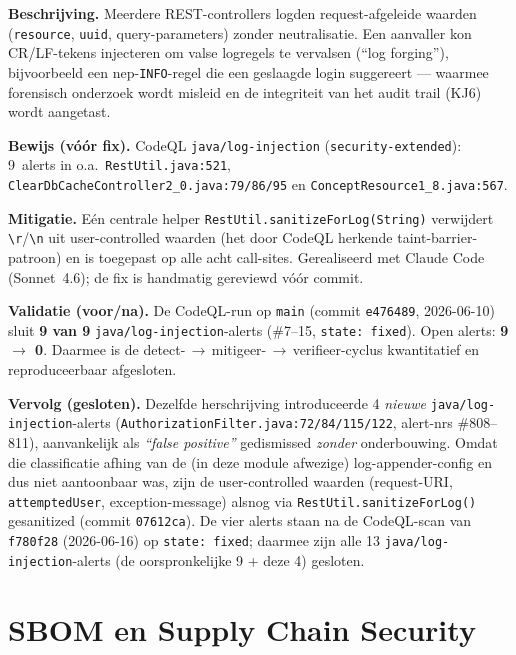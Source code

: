 \documentclass[12pt, a4paper]{report}
\begin{document}
\textbf{Beschrijving.} Meerdere REST-controllers logden request-afgeleide waarden
(\texttt{resource}, \texttt{uuid}, query-parameters) zonder neutralisatie. Een
aanvaller kon CR/LF-tekens injecteren om valse logregels te vervalsen (``log
forging''), bijvoorbeeld een nep-\texttt{INFO}-regel die een geslaagde login
suggereert --- waarmee forensisch onderzoek wordt misleid en de integriteit van het
audit trail (KJ6) wordt aangetast.

\textbf{Bewijs (vóór fix).} CodeQL \texttt{java/log-injection}
(\texttt{security-extended}): 9~alerts in o.a.\ \texttt{RestUtil.java:521},
\texttt{ClearDbCacheController2\_0.java:79/86/95} en
\texttt{ConceptResource1\_8.java:567}.

\textbf{Mitigatie.} Eén centrale helper \texttt{RestUtil.sanitizeForLog(String)}
verwijdert \texttt{\textbackslash r}/\texttt{\textbackslash n} uit user-controlled
waarden (het door CodeQL herkende taint-barrier-patroon) en is toegepast op alle
acht call-sites. Gerealiseerd met Claude Code (Sonnet~4.6); de fix is handmatig
gereviewd vóór commit.

\textbf{Validatie (voor/na).} De CodeQL-run op \texttt{main}
(commit \texttt{e476489}, 2026-06-10) sluit \textbf{9 van 9}
\texttt{java/log-injection}-alerts (\#7--15, \texttt{state: fixed}). Open alerts:
\textbf{9 $\to$ 0}. Daarmee is de detect-\,$\to$\,mitigeer-\,$\to$\,verifieer-cyclus
kwantitatief en reproduceerbaar afgesloten.

\textbf{Vervolg (gesloten).} Dezelfde herschrijving introduceerde 4 \emph{nieuwe}
\texttt{java/log-injection}-alerts (\texttt{AuthorizationFilter.java:72/84/115/122},
alert-nrs \#808--811), aanvankelijk als \emph{``false positive''} gedismissed
\emph{zonder} onderbouwing. Omdat die classificatie afhing van de (in deze module
afwezige) log-appender-config en dus niet aantoonbaar was, zijn de user-controlled
waarden (request-URI, \texttt{attemptedUser}, exception-message) alsnog via
\texttt{RestUtil.sanitizeForLog()} gesanitized (commit \texttt{07612ca}). De vier
alerts staan na de CodeQL-scan van \texttt{f780f28} (2026-06-16) op
\texttt{state: fixed}; daarmee zijn alle 13 \texttt{java/log-injection}-alerts
(de oorspronkelijke 9 + deze 4) gesloten.

\newpage

\chapter{SBOM en Supply Chain Security}
\label{ch:sbom}
\end{document}
